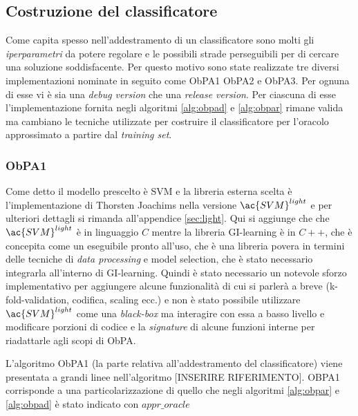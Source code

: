 \subsection{Costruzione del classificatore}
Come capita spesso nell'addestramento di un classificatore  sono molti gli \textit{iperparametri} da potere regolare e le possibili strade perseguibili per di cercare una soluzione soddisfacente. Per questo motivo sono state realizzate tre diversi implementazioni nominate in seguito come \ac{ObPA}1 \ac{ObPA}2 e \ac{ObPA}3. Per ognuna di esse vi è sia una \textit{debug version} che una \textit{release version}. Per ciascuna di esse l'implementazione fornita negli algoritmi \ref{alg:obpad} e \ref{alg:obpar} rimane valida ma cambiano le tecniche utilizzate per costruire il classificatore per l'oracolo approssimato a partire dal \textit{training set}.

\subsubsection{ObPA1}
Come detto il modello prescelto è \ac{SVM} e la libreria esterna scelta è l'implementazione di Thorsten Joachims nella versione $\ac{SVM}^{light}$ e per ulteriori dettagli si rimanda all'appendice \ref{sec:light}. Qui si aggiunge che che $\ac{SVM}^{light}$ è in linguaggio $C$ mentre la libreria GI-learning è in $C++$, che è concepita come un eseguibile pronto all'uso, che è una libreria povera  in termini delle tecniche di \textit{data processing} e model selection, che è stato necessario integrarla all'interno di GI-learning. Quindi è stato necessario un notevole sforzo implementativo per aggiungere alcune funzionalità di cui si parlerà a breve (k-fold-validation, codifica, scaling ecc.) e non è stato possibile utilizzare  $\ac{SVM}^{light}$ come una \textit{black-box} ma interagire con essa a basso livello e modificare porzioni di codice e la \textit{signature} di alcune funzioni interne per riadattarle agli scopi di \ac{ObPA}.

L'algoritmo \ac{ObPA}1 (la parte relativa all'addestramento del classificatore) viene presentata a grandi linee nell'algoritmo [INSERIRE RIFERIMENTO]. OBPA1 corrisponde a una particolarizzazione di quello che negli algoritmi \ref{alg:obpar} e \ref{alg:obpad} è stato indicato con $appr\_oracle$

